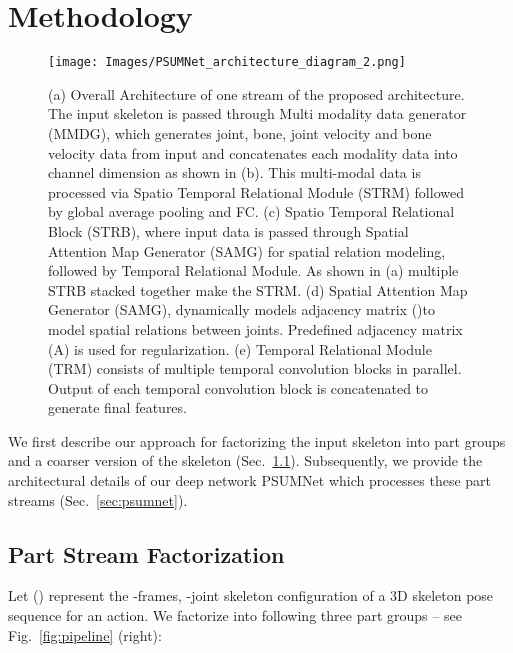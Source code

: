 \documentclass[runningheads]{llncs}
\begin{document}
\section{Methodology}
\label{sec:methodology}

\begin{figure*}[!t]
  \centering
  \texttt{[image: Images/PSUMNet\_architecture\_diagram\_2.png]}
  \caption{(a) Overall Architecture of one stream of the proposed architecture. The input skeleton is passed through Multi modality data generator (MMDG), which generates joint, bone, joint velocity and bone velocity data from input and concatenates each modality data into channel dimension as shown in (b). This multi-modal data is processed via Spatio Temporal Relational Module (STRM) followed by global average pooling and FC. (c) Spatio Temporal Relational Block (STRB), where input data is passed through Spatial Attention Map Generator (SAMG) for spatial relation modeling, followed by Temporal Relational Module. As shown in (a) multiple STRB stacked together make the STRM. (d) Spatial Attention Map Generator (SAMG), dynamically models adjacency matrix ()to model spatial relations between joints. Predefined adjacency matrix (A) is used for regularization.  (e) Temporal Relational Module (TRM) consists of multiple temporal convolution blocks in parallel. Output of each temporal convolution block is concatenated to generate final features.}
  \label{fig:architecture}
\end{figure*}

We first describe our approach for factorizing the input skeleton into part groups and a coarser version of the skeleton (Sec.~\ref{sec:partstream}). Subsequently, we provide the architectural details of our deep network PSUMNet which processes these part streams (Sec.~\ref{sec:psumnet}).

\subsection{Part Stream Factorization}
\label{sec:partstream}



Let  () represent the -frames, -joint skeleton configuration of a 3D skeleton pose sequence for an action. We factorize  into following three part groups -- see Fig.~\ref{fig:pipeline} (right):
\end{document}
